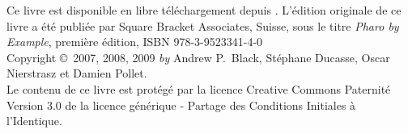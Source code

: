 \documentclass[a4paper,10pt,twoside]{book}
\newcommand{\pbeoriginalcopydates}{2007, 2008, 2009\xspace} %
\newcommand{\pbeoriginalcopyidx}{Première\xspace} %
\newcommand{\isbnoriginallulu}{978-3-9523341-4-0\xspace}
\begin{document}
\begin{footnotesize}
\setlength{\parindent}{0pt}
Ce livre est disponible en libre t\'el\'echargement depuis
\ppe. L'édition originale de ce livre a été publiée par Square Bracket Associates, Suisse, sous le titre \emph{Pharo by Example}, \lowercase{\pbeoriginalcopyidx} édition, ISBN \isbnoriginallulu\\[1cm]

Copyright \copyright~\pbeoriginalcopydates{} \emph{by} Andrew P.~Black, St\'ephane
Ducasse, Oscar Nierstrasz et Damien Pollet.\\[1cm] %

Le contenu de ce livre est prot\'eg\'e par la licence Creative Commons
Paternit\'e Version 3.0 de la licence g\'en\'erique - Partage des Conditions Initiales \`a l'Identique.


\end{footnotesize}
\end{document}
